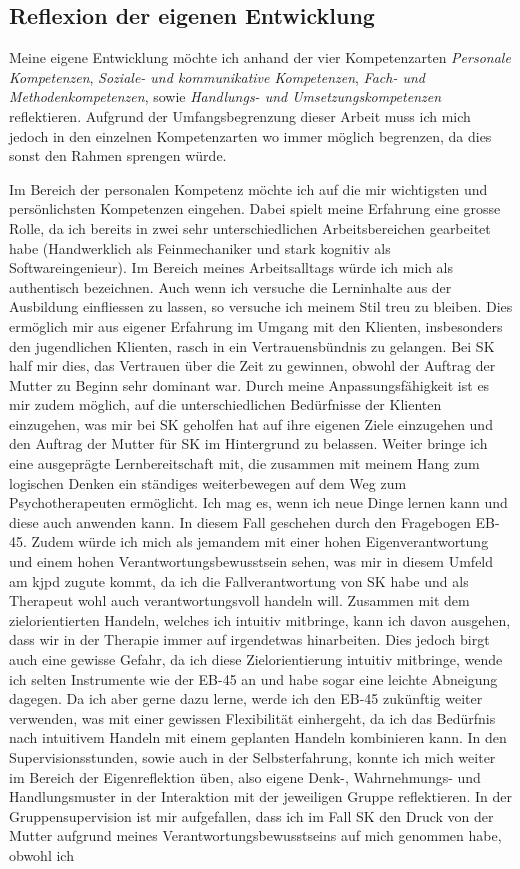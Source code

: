 \subsection{Reflexion der eigenen Entwicklung} \label{sec:reflexionEntwicklung}
Meine eigene Entwicklung möchte ich anhand der vier Kompetenzarten \textit{Personale Kompetenzen}, \textit{Soziale- und kommunikative Kompetenzen}, \textit{Fach- und Methodenkompetenzen}, sowie \textit{Handlungs- und Umsetzungskompetenzen} reflektieren. Aufgrund der Umfangsbegrenzung dieser Arbeit muss ich mich jedoch in den einzelnen Kompetenzarten wo immer möglich begrenzen, da dies sonst den Rahmen sprengen würde.

Im Bereich der personalen Kompetenz möchte ich auf die mir wichtigsten und persönlichsten Kompetenzen eingehen. Dabei spielt meine Erfahrung eine grosse Rolle, da ich bereits in zwei sehr unterschiedlichen Arbeitsbereichen gearbeitet habe (Handwerklich als Feinmechaniker und stark kognitiv als Softwareingenieur). Im Bereich meines Arbeitsalltags würde ich mich als authentisch bezeichnen. Auch wenn ich versuche die Lerninhalte aus der Ausbildung einfliessen zu lassen, so versuche ich meinem Stil treu zu bleiben. Dies ermöglich mir aus eigener Erfahrung im Umgang mit den Klienten, insbesonders den jugendlichen Klienten, rasch in ein Vertrauensbündnis zu gelangen. Bei SK half mir dies, das Vertrauen über die Zeit zu gewinnen, obwohl der Auftrag der Mutter zu Beginn sehr dominant war. Durch meine Anpassungsfähigkeit ist es mir zudem möglich, auf die unterschiedlichen Bedürfnisse der Klienten einzugehen, was mir bei SK geholfen hat auf ihre eigenen Ziele einzugehen und den Auftrag der Mutter für SK im Hintergrund zu belassen. Weiter bringe ich eine ausgeprägte Lernbereitschaft mit, die zusammen mit meinem Hang zum logischen Denken ein ständiges weiterbewegen auf dem Weg zum Psychotherapeuten ermöglicht. Ich mag es, wenn ich neue Dinge lernen kann und diese auch anwenden kann. In diesem Fall geschehen durch den Fragebogen EB-45. Zudem würde ich mich als jemandem mit einer hohen Eigenverantwortung und einem hohen Verantwortungsbewusstsein sehen, was mir in diesem Umfeld am \ac{kjpd} zugute kommt, da ich die Fallverantwortung von SK habe und als Therapeut wohl auch verantwortungsvoll handeln will. Zusammen mit dem zielorientierten Handeln, welches ich intuitiv mitbringe, kann ich davon ausgehen, dass wir in der Therapie immer auf irgendetwas hinarbeiten. Dies jedoch birgt auch eine gewisse Gefahr, da ich diese Zielorientierung intuitiv mitbringe, wende ich selten Instrumente wie der EB-45 an und habe sogar eine leichte Abneigung dagegen. Da ich aber gerne dazu lerne, werde ich den EB-45 zukünftig weiter verwenden, was mit einer gewissen Flexibilität einhergeht, da ich das Bedürfnis nach intuitivem Handeln mit einem geplanten Handeln kombinieren kann. In den Supervisionsstunden, sowie auch in der Selbsterfahrung, konnte ich mich weiter im Bereich der Eigenreflektion üben, also eigene Denk-, Wahrnehmungs- und Handlungsmuster in der Interaktion mit der jeweiligen Gruppe reflektieren. In der Gruppensupervision ist mir aufgefallen, dass ich im Fall SK den Druck von der Mutter aufgrund meines Verantwortungsbewusstseins auf mich genommen habe, obwohl ich 